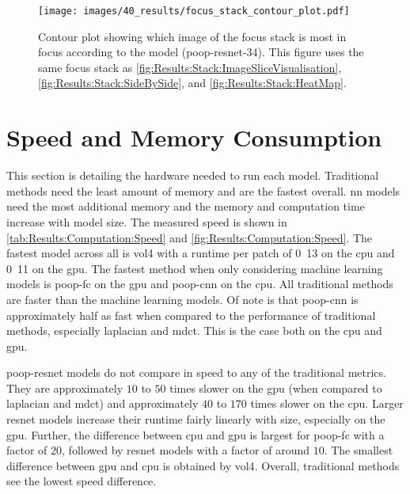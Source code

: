\begin{figure}
    \centering
    \texttt{[image: images/40\_results/focus\_stack\_contour\_plot.pdf]}
    \caption[Best index contours]{Contour plot showing which image of the focus stack is most in focus according to the model (\acs{poop}-\acs{resnet}-34). This figure uses the same focus stack as \autoref{fig:Results:Stack:ImageSliceVisualisation}, \autoref{fig:Results:Stack:SideBySide}, and \autoref{fig:Results:Stack:HeatMap}.}
    \label{fig:Results:Stack:ContourPlot}
\end{figure}

\FloatBarrier

\section{Speed and Memory Consumption}
\label{sec:Results:Computation}

This section is detailing the hardware needed to run each model. Traditional methods need the least amount of memory and are the fastest overall. \Acl{nn} models need the most additional memory and the memory and computation time increase with model size. The measured speed is shown in  \autoref{tab:Results:Computation:Speed} and \autoref{fig:Results:Computation:Speed}.
The fastest model across all is \ac{vol4} with a runtime per patch of \unit{0.13}{\milli\second} on the \ac{cpu} and \unit{0.11}{\milli\second} on the \ac{gpu}. The fastest method when only considering machine learning models is \ac{poop}-\ac{fc} on the \ac{gpu} and \ac{poop}-\ac{cnn} on the \ac{cpu}. All traditional methods are faster than the machine learning models. Of note is that \ac{poop}-\ac{cnn} is approximately half as fast when compared to the performance of traditional methods, especially \ac{laplacian} and \ac{mdct}. This is the case both on the \ac{cpu} and \ac{gpu}. 

\ac{poop}-\ac{resnet} models do not compare in speed to any of the traditional metrics. They are approximately $10$ to $50$ times slower on the \ac{gpu} (when compared to \ac{laplacian} and \ac{mdct}) and approximately $40$ to $170$ times slower on the \ac{cpu}. Larger \ac{resnet} models increase their runtime fairly linearly with size, especially on the \ac{gpu}. Further, the difference between \ac{cpu} and \ac{gpu} is largest for \ac{poop}-\ac{fc} with a factor of $20$, followed by \ac{resnet} models with a factor of around $10$. The smallest difference between \ac{gpu} and \ac{cpu} is obtained by \ac{vol4}. Overall, traditional methods see the lowest speed difference.

